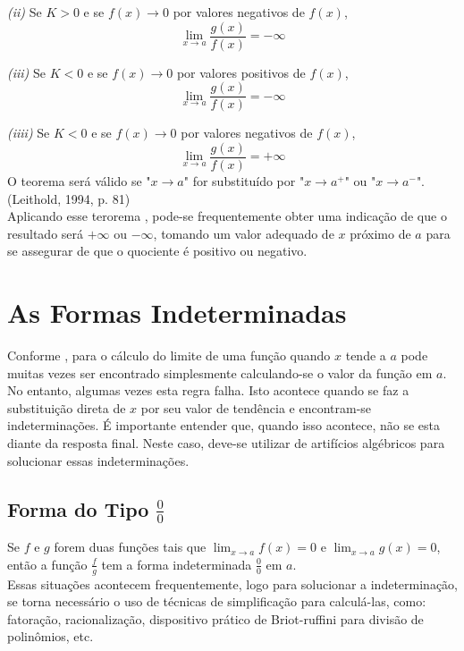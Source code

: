 \textit{(ii)} Se $K > 0$  e se $f(x) \to 0$ por valores negativos de $f(x)$,
$$
\lim_{x \to a} \frac{g(x)}{f(x)} = - \infty
$$

\textit{(iii)} Se $K < 0$  e se $f(x) \to 0$ por valores positivos de $f(x)$,
$$
\lim_{x \to a} \frac{g(x)}{f(x)} = - \infty
$$

\textit{(iiii)} Se $K < 0$  e se $f(x) \to 0$ por valores negativos de $f(x)$,
$$
\lim_{x \to a} \frac{g(x)}{f(x)} = + \infty
$$
\quad O teorema será válido se "$x \to a$" for substituído por "$x \to a^+$" ou "$x \to a^-$". (Leithold, 1994, p. 81)\\

Aplicando esse terorema , pode-se frequentemente obter uma indicação de que o resultado será $+ \infty$ ou $- \infty$, tomando um valor adequado de $x$ próximo de $a$ para se assegurar de que o quociente é positivo ou negativo.



\section{As Formas Indeterminadas}
\quad Conforme , para o cálculo do limite de uma função quando $x$ tende a $a$ pode muitas vezes ser encontrado simplesmente calculando-se o valor da função em $a$. No entanto, algumas vezes esta regra falha. Isto acontece quando se faz a substituição direta de $x$ por seu valor de tendência e encontram-se indeterminações. É importante entender que, quando isso acontece, não se esta diante da resposta final. Neste caso, deve-se utilizar de artifícios algébricos para solucionar essas indeterminações.\\

\subsection{Forma do Tipo $\displaystyle \frac{0}{0}$}
\quad Se $f$ e $g$ forem duas funções tais que $\displaystyle \lim_{x \to a} f(x)= 0$ e $\displaystyle \lim_{x \to a} g(x)= 0$, então a função $\displaystyle \frac{f}{g}$ tem a forma indeterminada $\displaystyle \frac{0}{0}$ em $a$.\\

Essas situações acontecem frequentemente, logo para solucionar a indeterminação, se torna necessário o uso de técnicas de simplificação para calculá-las, como: fatoração, racionalização, dispositivo prático de Briot-ruffini para divisão de polinômios, etc.



